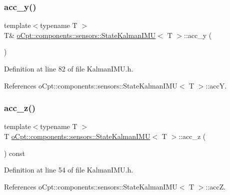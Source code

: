 \subsubsection{\texorpdfstring{acc\+\_\+y()}{acc\_y()}\hspace{0.1cm}{\footnotesize\ttfamily [2/2]}}
{\footnotesize\ttfamily template$<$typename T $>$ \\
T\& \hyperlink{classo_cpt_1_1components_1_1sensors_1_1_state_kalman_i_m_u}{o\+Cpt\+::components\+::sensors\+::\+State\+Kalman\+I\+MU}$<$ T $>$\+::acc\+\_\+y (\begin{DoxyParamCaption}{ }\end{DoxyParamCaption})\hspace{0.3cm}{\ttfamily [inline]}}



Definition at line 82 of file Kalman\+I\+M\+U.\+h.



References o\+Cpt\+::components\+::sensors\+::\+State\+Kalman\+I\+M\+U$<$ T $>$\+::accY.

\hypertarget{classo_cpt_1_1components_1_1sensors_1_1_state_kalman_i_m_u_a0f360ba5c223defb8fbd401b5d46d8df}{}\label{classo_cpt_1_1components_1_1sensors_1_1_state_kalman_i_m_u_a0f360ba5c223defb8fbd401b5d46d8df} 
\subsubsection{\texorpdfstring{acc\+\_\+z()}{acc\_z()}\hspace{0.1cm}{\footnotesize\ttfamily [1/2]}}
{\footnotesize\ttfamily template$<$typename T $>$ \\
T \hyperlink{classo_cpt_1_1components_1_1sensors_1_1_state_kalman_i_m_u}{o\+Cpt\+::components\+::sensors\+::\+State\+Kalman\+I\+MU}$<$ T $>$\+::acc\+\_\+z (\begin{DoxyParamCaption}{ }\end{DoxyParamCaption}) const\hspace{0.3cm}{\ttfamily [inline]}}



Definition at line 54 of file Kalman\+I\+M\+U.\+h.



References o\+Cpt\+::components\+::sensors\+::\+State\+Kalman\+I\+M\+U$<$ T $>$\+::accZ.



